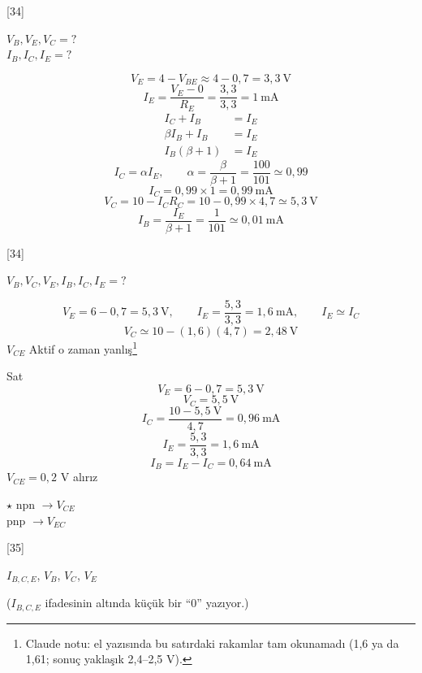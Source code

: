 \documentclass[11pt,a4paper]{article}
\begin{document}
\begin{ornek}[6.4]
[34]

$V_B, V_E, V_C = ?$\\
$I_B, I_C, I_E = ?$
\end{ornek}

\begin{cozum}
\[ V_E = 4-V_{BE} \approx 4-0{,}7 = 3{,}3\ \mathrm{V} \]
\[ I_E = \frac{V_E-0}{R_E} = \frac{3{,}3}{3{,}3} = 1\ \mathrm{mA} \]
\begin{align*}
I_C+I_B &= I_E \\
\beta I_B+I_B &= I_E \\
I_B(\beta+1) &= I_E
\end{align*}
\[ I_C = \alpha I_E, \qquad \alpha = \frac{\beta}{\beta+1} = \frac{100}{101} \simeq 0{,}99 \]
\[ I_C = 0{,}99\times 1 = 0{,}99\ \mathrm{mA} \]
\[ V_C = 10-I_C R_C = 10-0{,}99\times 4{,}7 \simeq 5{,}3\ \mathrm{V} \]
\[ I_B = \frac{I_E}{\beta+1} = \frac{1}{101} \simeq 0{,}01\ \mathrm{mA} \]
\end{cozum}

\begin{ornek}[6.5]
[34]

$V_B, V_C, V_E, I_B, I_C, I_E = ?$
\end{ornek}

\begin{cozum}
\[ V_E = 6-0{,}7 = 5{,}3\ \mathrm{V}, \qquad I_E = \frac{5{,}3}{3{,}3} = 1{,}6\ \mathrm{mA}, \qquad I_E \simeq I_C \]
\[ V_C \simeq 10-(1{,}6)(4{,}7) = 2{,}48\ \mathrm{V} \]
$V_{CE}$ Aktif  o zaman yanlış\footnote{Claude notu: el yazısında bu satırdaki rakamlar tam okunamadı (1,6 ya da 1,61; sonuç yaklaşık 2,4--2,5 V).}

Sat
\[ V_E = 6-0{,}7 = 5{,}3\ \mathrm{V} \]
\[ V_C = 5{,}5\ \mathrm{V} \]
\[ I_C = \frac{10-5{,}5\ \mathrm{V}}{4{,}7} = 0{,}96\ \mathrm{mA} \]
\[ I_E = \frac{5{,}3}{3{,}3} = 1{,}6\ \mathrm{mA} \]
\[ I_B = I_E-I_C = 0{,}64\ \mathrm{mA} \]
$V_{CE} = 0{,}2$ V alırız
\end{cozum}

$\star$ npn $\rightarrow V_{CE}$\\
pnp $\rightarrow V_{EC}$

\begin{ornek}[6.6]
[35]

$I_{B,C,E}$, $V_B$, $V_C$, $V_E$
\end{ornek}
{\small\color{kursunkalem}($I_{B,C,E}$ ifadesinin altında küçük bir ``0'' yazıyor.)}
\end{document}
